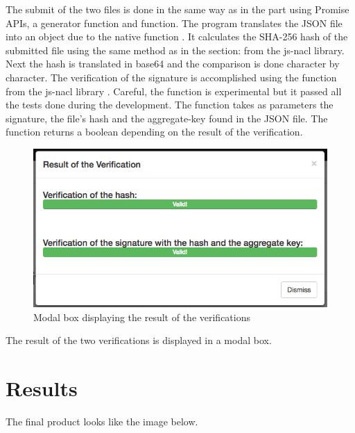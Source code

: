 \documentclass[11pt, a4paper, twoside, openright, openany]{article}
\begin{document}
The submit of the two files is done in the same way as in the  part
using Promise APIs, a generator function and  function.
\newline \newline
The program translates the JSON file into an object due to the native function .
\newline
It calculates the SHA-256 hash of the submitted file using the same method as in the
section:  from the js-nacl library.
Next the hash is translated in base64 and the comparison is done character by character.
\newline \newline
The verification of the signature is accomplished using the function
from the js-nacl library .
\newline
Careful, the function is experimental but it passed all the tests done during the development.
\newline
The function takes as parameters the signature, the file's hash and the aggregate-key found in
the JSON file. The function returns a boolean depending on the result of the verification.
\newline

\begin{figure}[ht!]
\centering
\includegraphics[scale=0.5]{modal.jpg}
\caption{Modal box displaying the result of the verifications}
\end{figure}
The result of the two verifications is displayed in a modal box.
\bigbreak
\clearpage

\section{Results}
The final product looks like the image below.
\bigbreak
\end{document}
